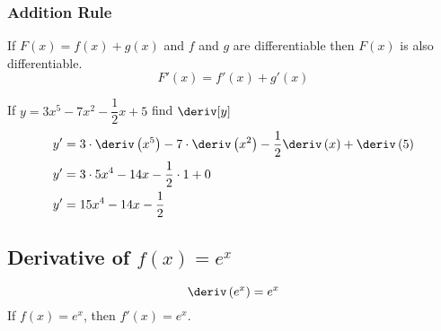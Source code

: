 \subsubsection{Addition Rule}
\begin{theorem}
    If $F(x) = f(x) + g(x)$ and $f$ and $g$ are differentiable then $F(x)$ is also differentiable.
    \begin{equation}
        F'(x) = f'(x) + g'(x)
    \end{equation}
\end{theorem}
\begin{example}
    If $y=3x^5 - 7x^2 - \dfrac{1}{2}x + 5$ find $\deriv[y]$
    \begin{align*}
        y' &= 3 \cdot \deriv \left(x^5\right) - 7 \cdot \deriv \left(x^2\right) - \dfrac{1}{2} \deriv \left(x\right) + \deriv \left(5\right)\\
        y' &= 3 \cdot 5x^4 - 14x - \dfrac{1}{2} \cdot 1 + 0 \\
        y' &= 15x^4 - 14x - \dfrac{1}{2}
    \end{align*}
\end{example}
\subsection{Derivative of $f(x) = e^x$}
\begin{theorem}[Derivative of $f(x) = e^x$]
    \begin{equation}
        \deriv\left(e^x\right) = e^x
    \end{equation}
    If $f(x) = e^x$, then $f'(x) = e^x$.
\end{theorem}
